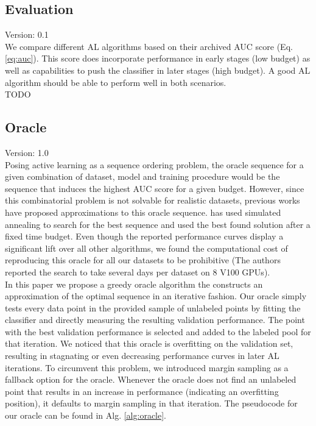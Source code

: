 \documentclass[]{article}
\begin{document}
\subsection{Evaluation}\label{sec:evaluation}
{\color{red} Version: 0.1}\\
We compare different AL algorithms based on their archived AUC score (Eq. \ref{eq:auc}).
This score does incorporate performance in early stages (low budget) as well as capabilities to push the classifier in later stages (high budget).
A good AL algorithm should be able to perform well in both scenarios. \\
{\color{red} TODO}

\subsection{Oracle}\label{sec:oracle}
{\color{red} Version: 1.0}\\
Posing active learning as a sequence ordering problem, the oracle sequence for a given combination of dataset, model and training procedure would be the sequence that induces the highest AUC score for a given budget.
However, since this combinatorial problem is not solvable for realistic datasets, previous works have proposed approximations to this oracle sequence.
\cite{zhou2021towards} has used simulated annealing to search for the best sequence and used the best found solution after a fixed time budget. 
Even though the reported performance curves display a significant lift over all other algorithms, we found the computational cost of reproducing this oracle for all our datasets to be prohibitive (The authors reported the search to take several days per dataset on 8 V100 GPUs). \\
In this paper we propose a greedy oracle algorithm the constructs an approximation of the optimal sequence in an iterative fashion.
Our oracle simply tests every data point in the provided sample of unlabeled points by fitting the classifier and directly measuring the resulting validation performance.
The point with the best validation performance is selected and added to the labeled pool for that iteration.
We noticed that this oracle is overfitting on the validation set, resulting in stagnating or even decreasing performance curves in later AL iterations.
To circumvent this problem, we introduced margin sampling as a fallback option for the oracle.
Whenever the oracle does not find an unlabeled point that results in an increase in performance (indicating an overfitting position), it defaults to margin sampling in that iteration.
The pseudocode for our oracle can be found in Alg. \ref{alg:oracle}.
\end{document}

